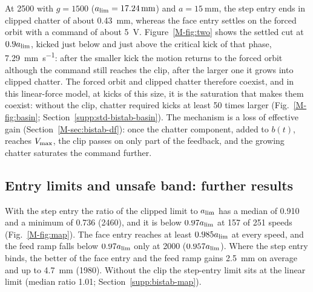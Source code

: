 At \SI{2500}{\rpm} with $g=1500$ ($a_{\lim}=\SI{17.24}{\milli\metre}$) and $a=\SI{15}{\milli\metre}$, the step entry ends in clipped chatter of about \SI{0.43}{\milli\metre}, whereas the face entry settles on the forced orbit with a command of about \SI{5}{\volt}. Figure~\ref{M-fig:two} shows the settled cut at $0.9a_{\lim}$, kicked just below and just above the critical kick of that phase, \SI{7.29}{\milli\metre\per\second}: after the smaller kick the motion returns to the forced orbit although the command still reaches the clip, after the larger one it grows into clipped chatter. The forced orbit and clipped chatter therefore coexist, and in this linear-force model, at kicks of this size, it is the saturation that makes them coexist: without the clip, chatter required kicks at least 50 times larger (Fig.~\ref{M-fig:basin}; Section~\ref{supp:std-bistab-basin}). The mechanism is a loss of effective gain (Section~\ref{M-sec:bistab-df}): once the chatter component, added to $b(t)$, reaches $V_{\max}$, the clip passes on only part of the feedback, and the growing chatter saturates the command further.

\subsection{Entry limits and unsafe band: further results}\label{supp:std-bistab-map}

With the step entry the ratio of the clipped limit to $a_{\lim}$ has a median of 0.910 and a minimum of 0.736 (\SI{2460}{\rpm}), and it is below $0.97a_{\lim}$ at 157 of 251 speeds (Fig.~\ref{M-fig:map}). The face entry reaches at least $0.985a_{\lim}$ at every speed, and the feed ramp falls below $0.97a_{\lim}$ only at \SI{2000}{\rpm} ($0.957a_{\lim}$). Where the step entry binds, the better of the face entry and the feed ramp gains \SI{2.5}{\milli\metre} on average and up to \SI{4.7}{\milli\metre} (\SI{1980}{\rpm}). Without the clip the step-entry limit sits at the linear limit (median ratio 1.01; Section~\ref{supp:bistab-map}).

